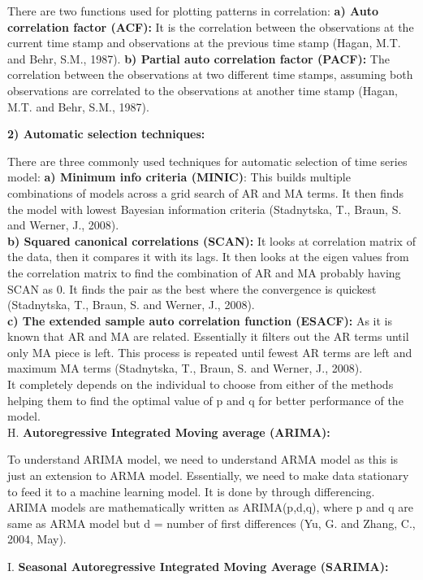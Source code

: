 \documentclass[12pt,a4paper]{article}
\begin{document}
\begin{flushleft}
		There are two functions used for plotting patterns in correlation:
		\textbf{a)	Auto correlation factor (ACF):} It is the correlation between the observations at the current time stamp and observations at the previous time stamp (Hagan, M.T. and Behr, S.M., 1987). 
		\textbf{b)	Partial auto correlation factor (PACF):} The correlation between the observations at two different time stamps, assuming both observations are correlated to the observations at another time stamp (Hagan, M.T. and Behr, S.M., 1987). 
		
		\textbf{2) Automatic selection techniques: }
		
		There are three commonly used techniques for automatic selection of time series model:
		\textbf{a)	Minimum info criteria (MINIC)}: This builds multiple combinations of models across a grid search of AR and MA terms. It then finds the model with lowest Bayesian information criteria (Stadnytska, T., Braun, S. and Werner, J., 2008). \\
		\textbf{b)	Squared canonical correlations (SCAN):} It looks at correlation matrix of the data, then it compares it with its lags. It then looks at the eigen values from the correlation matrix to find the combination of AR and MA probably having SCAN as 0. It finds the pair as the best where the convergence is quickest (Stadnytska, T., Braun, S. and Werner, J., 2008).\\
		\textbf{c)	The extended sample auto correlation function (ESACF):} As it is known that AR and MA are related. Essentially it filters out the AR terms until only MA piece is left. This process is repeated until fewest AR terms are left and maximum MA terms (Stadnytska, T., Braun, S. and Werner, J., 2008).\\
		It completely depends on the individual to choose from either of the methods helping them to find the optimal value of p and q for better performance of the model.\\
		
		H.	\textbf{Autoregressive Integrated Moving average (ARIMA):}
		
		To understand ARIMA model, we need to understand ARMA model as this is just an extension to ARMA model. Essentially, we need to make data stationary to feed it to a machine learning model. It is done by through differencing. ARIMA models are mathematically written as ARIMA(p,d,q), where p and q are same as ARMA model but d = number of first differences (Yu, G. and Zhang, C., 2004, May). 
		
		I.	\textbf{Seasonal Autoregressive Integrated Moving Average (SARIMA):}
		

\end{flushleft}
\end{document}
